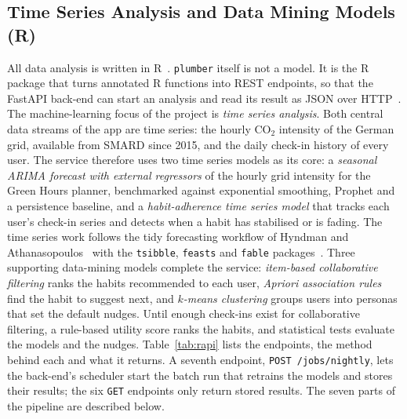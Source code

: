 \documentclass[conference]{IEEEtran}
\newcommand{\COtwo}{CO$_2$}
\newcommand{\pkg}[1]{\texttt{#1}}
\begin{document}
\subsection{Time Series Analysis and Data Mining Models (R)}
\label{sec:ml}
All data analysis is written in R~\cite{rcore}. \pkg{plumber} itself is not a model. It is the R package that turns annotated R functions into REST endpoints, so that the FastAPI back-end can start an analysis and read its result as JSON over HTTP~\cite{plumber}. The machine-learning focus of the project is \emph{time series analysis}. Both central data streams of the app are time series: the hourly \COtwo{} intensity of the German grid, available from SMARD since 2015, and the daily check-in history of every user. The service therefore uses two time series models as its core: a \emph{seasonal ARIMA forecast with external regressors} of the hourly grid intensity for the Green Hours planner, benchmarked against exponential smoothing, Prophet and a persistence baseline, and a \emph{habit-adherence time series model} that tracks each user's check-in series and detects when a habit has stabilised or is fading. The time series work follows the tidy forecasting workflow of Hyndman and Athanasopoulos~\cite{fpp3} with the \pkg{tsibble}, \pkg{feasts} and \pkg{fable} packages~\cite{fable}. Three supporting data-mining models complete the service: \emph{item-based collaborative filtering} ranks the habits recommended to each user, \emph{Apriori association rules} find the habit to suggest next, and \emph{$k$-means clustering} groups users into personas that set the default nudges. Until enough check-ins exist for collaborative filtering, a rule-based utility score ranks the habits, and statistical tests evaluate the models and the nudges. Table~\ref{tab:rapi} lists the endpoints, the method behind each and what it returns. A seventh endpoint, \texttt{POST /jobs/nightly}, lets the back-end's scheduler start the batch run that retrains the models and stores their results; the six \texttt{GET} endpoints only return stored results. The seven parts of the pipeline are described below.
\end{document}
